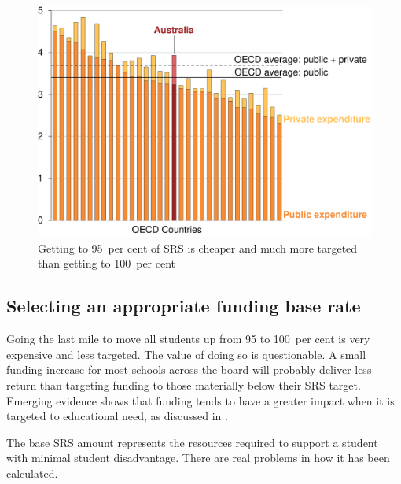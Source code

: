 \documentclass{grattan}
\begin{document}
\begin{figure}[p]
\caption{Getting to 95~per cent of SRS is cheaper and much more targeted than getting to 100~per cent\label{fig:getting-to-95pc-cheaper-more-targeted-than-100pc}}

\includegraphics[page=5]{atlas/Charts.pdf}

\end{figure}




\subsection{Selecting an appropriate funding base rate} \label{subsec:Selecting-an-appropriate-funding-base-rate}

Going the last mile to move all students up from 95 to 100~per cent is very expensive and less targeted.
The value of doing so is questionable.
A small funding increase for most schools across the board will probably deliver less return than targeting funding to those materially below their SRS target.
Emerging evidence shows that funding tends to have a greater impact when it is targeted to educational need, as discussed in .

The base SRS amount represents the resources required to support a student with minimal student disadvantage. There are real problems in how it has been calculated.
\end{document}
